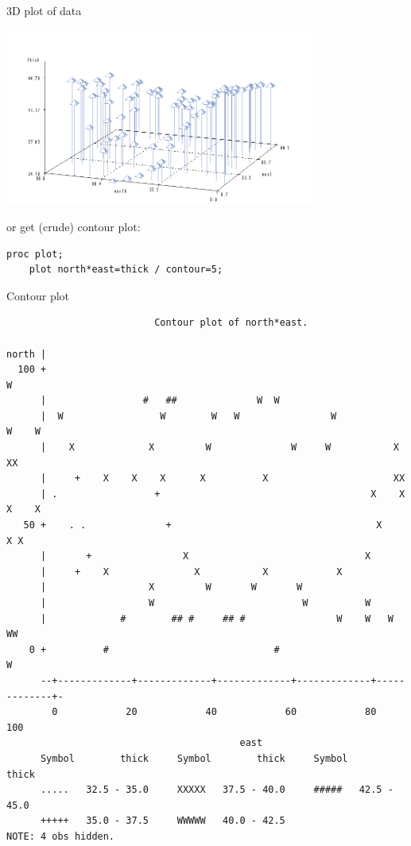 \begin{frame}[fragile]{3D plot of data}

\includegraphics[width=4in]{thick1}

or get (crude) contour plot:

\begin{verbatim}
proc plot;
    plot north*east=thick / contour=5;

\end{verbatim}
  
\end{frame}

\begin{frame}[fragile]{Contour plot}

{\scriptsize
\begin{verbatim}
                          Contour plot of north*east.

north |
  100 +                                                               W
      |                 #   ##              W  W
      |  W                 W        W   W                W            W    W
      |    X             X         W              W     W           X    XX
      |     +    X    X    X      X          X                      XX
      | .                 +                                     X    X  X    X
   50 +    . .              +                                    X     X X
      |       +                X                               X
      |     +    X               X           X            X
      |                  X         W       W       W
      |                  W                          W          W
      |             #        ## #     ## #                W    W   W  WW
    0 +          #                             #                      W
      --+-------------+-------------+-------------+-------------+-------------+-
        0            20            40            60            80            100
                                         east
      Symbol        thick     Symbol        thick     Symbol        thick
      .....   32.5 - 35.0     XXXXX   37.5 - 40.0     #####   42.5 - 45.0
      +++++   35.0 - 37.5     WWWWW   40.0 - 42.5
NOTE: 4 obs hidden.
\end{verbatim}
}

\end{frame}

